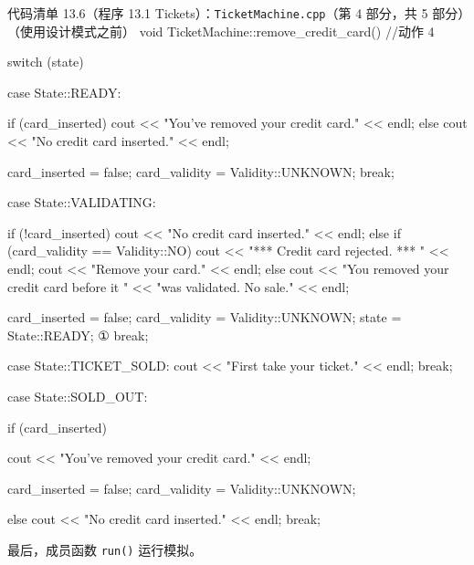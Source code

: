 \begin{codeboxt}{代码清单 13.6（程序 13.1 Tickets）：\texttt{Ticket\allowbreak{}Machine.\allowbreak{}cpp}（第 4 部分，共 5 部分）（使用设计模式之前）}
void TicketMachine::remove_credit_card()  //动作 4
{
    switch (state)
    {
        case State::READY:
        {
            if (card_inserted)
            {
                cout << "You’ve removed your credit card." << endl;
            }
            else
            {
                cout << "No credit card inserted." << endl;
            }

            card_inserted = false;
            card_validity = Validity::UNKNOWN;
            break;
        }

        case State::VALIDATING:
        {
            if (!card_inserted)
            {
                cout << "No credit card inserted." << endl;
            }
            else if (card_validity == Validity::NO)
            {
                cout << "*** Credit card rejected. *** " << endl;
                cout << "Remove your card." << endl;
            }
            else
            {
                cout << "You removed your credit card before it "
                     << "was validated. No sale." << endl;
            }

            card_inserted = false;
            card_validity = Validity::UNKNOWN;
            state = State::READY;                         ①
            break;
        }

        case State::TICKET_SOLD:
        {
            cout << "First take your ticket." << endl;
            break;
        }

        case State::SOLD_OUT:
        {
            if (card_inserted)
            {
                cout << "You’ve removed your credit card." << endl;

                card_inserted = false;
                card_validity = Validity::UNKNOWN;
            }
            else
            {
                cout << "No credit card inserted." << endl;
            }
            break;
        }
    }
}
\end{codeboxt}
\par

最后，成员函数 \texttt{run()} 运行模拟。

